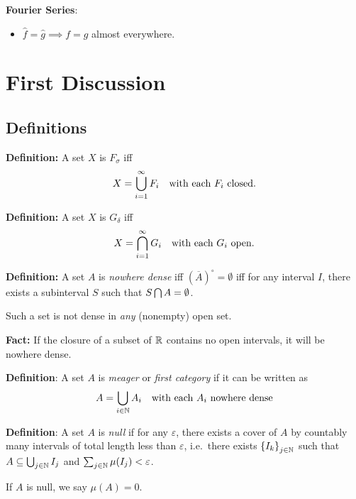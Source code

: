 \textbf{Fourier Series}:

\begin{itemize}
\tightlist
\item
  \(\hat f = \hat g \implies f=g\) almost everywhere.
\end{itemize}

\hypertarget{first-discussion}{%
\section{First Discussion}\label{first-discussion}}

\hypertarget{definitions}{%
\subsection{Definitions}\label{definitions}}

\textbf{Definition:} A set \(X\) is \(F_\sigma\) iff
\begin{align*}
X = \bigcup_{i=1}^\infty F_i \quad \text{with each $F_i$ closed.}
\end{align*}

\textbf{Definition:} A set \(X\) is \(G_\delta\) iff
\begin{align*}
X = \bigcap_{i=1}^\infty G_i \quad \text{with each $G_i$ open.}
\end{align*}

\textbf{Definition:} A set \(A\) is \emph{nowhere dense} iff
\((\overline{A})^\circ = \emptyset\) iff for any interval \(I\), there
exists a subinterval \(S\) such that \(S \bigcap A = \emptyset\).

Such a set is not dense in \emph{any} (nonempty) open set.

\textbf{Fact:} If the closure of a subset of \({\mathbb{R}}\) contains no open
intervals, it will be nowhere dense.

\textbf{Definition}: A set \(A\) is \emph{meager} or \emph{first
category} if it can be written as
\begin{align*}
A = \bigcup_{i\in {\mathbb{N}}} A_i\quad \text{with each $A_i$ nowhere dense}
\end{align*}

\textbf{Definition}: A set \(A\) is \emph{null} if for any
\(\varepsilon\), there exists a cover of \(A\) by countably many
intervals of total length less than \(\varepsilon\), i.e.~there exists
\(\left\{{I_k}\right\}_{j\in{\mathbb{N}}}\) such that
\(A\subseteq \bigcup_{j\in {\mathbb{N}}} I_j\) and
\(\sum_{j\in {\mathbb{N}}}\mu(I_j) < \varepsilon\).

If \(A\) is null, we say \(\mu(A) = 0\).

